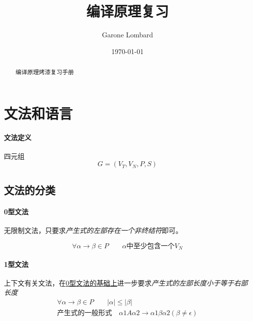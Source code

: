 \documentclass[UTF8]{ctexart} %
\title{编译原理复习}
\author{Garone Lombard}
\date{\today}
\begin{document}
\maketitle %

\newpage

\begin{abstract}
    编译原理烤漆复习手册
\end{abstract}

\newpage

\tableofcontents

\newpage

\section{文法和语言}

\paragraph{文法定义} 四元组
\begin{equation}
    G=(V_T,V_N,P,S)
\end{equation}
\subsection{文法的分类}

\paragraph{0型文法} 无限制文法，只要求\emph{产生式的左部存在一个非终结符}即可。

\begin{equation}
    \forall \alpha \rightarrow \beta \in P \qquad \alpha\text{中至少包含一个}V_N
\end{equation}

\paragraph{1型文法} 上下文有关文法，在\underline{0型文法的基础上}进一步要求\emph{产生式的左部长度小于等于右部长度}
\begin{equation}
    \begin{aligned}
        \forall \alpha \rightarrow \beta \in P \qquad |\alpha| \leq |\beta| \\
        \text{产生式的一般形式}\quad \alpha1A\alpha2 \rightarrow \alpha1\beta\alpha2(\beta \neq \epsilon)
    \end{aligned}
\end{equation}
\end{document}
